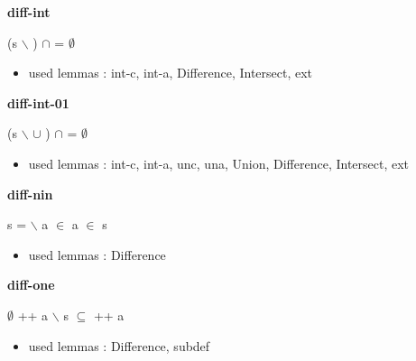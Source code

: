 \documentclass[a4paper]{article}
\begin{document}
\bigskip

{\large\bf diff-int}

\medskip

 \Fol (s $\backslash$ ) $\cap$  = $\emptyset$

\begin{itemize}


\item       used lemmas  : int-c, int-a, Difference, Intersect, ext

\end{itemize}

\medskip

\bigskip

{\large\bf diff-int-01}

\medskip

 \Fol (s $\backslash$  $\cup$ ) $\cap$  = $\emptyset$

\begin{itemize}


\item       used lemmas  : int-c, int-a, unc, una, Union, Difference, Intersect, ext

\end{itemize}

\medskip

\bigskip

{\large\bf diff-nin}

\medskip

 \Fol s =  $\backslash$  \And a $\in$  \Imp \Not a $\in$ s

\begin{itemize}


\item       used lemmas  : Difference

\end{itemize}

\medskip

\bigskip

{\large\bf diff-one}

\medskip

 \Fol $\emptyset$ ++ a $\backslash$ s $\subseteq$  ++ a

\begin{itemize}


\item       used lemmas  : Difference, subdef

\end{itemize}
\end{document}

